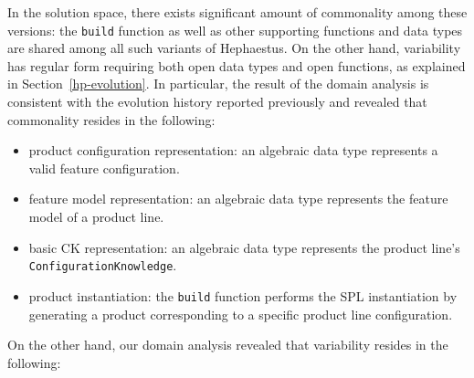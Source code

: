 In the solution space, there exists significant amount of commonality among these versions: the \texttt{build} function as well as other supporting functions and data types are shared among all such variants of Hephaestus.  On the other hand, variability has regular form requiring both
open data types and open functions, as explained in Section~\ref{hp-evolution}. In particular, the result of the domain analysis is consistent with the evolution history reported previously and revealed that commonality resides in the following:

\begin{itemize}
  \item product configuration representation: an algebraic data type represents a valid feature configuration.

  \item feature model representation: an algebraic data type represents the feature model of a product line.

  \item basic CK representation: an algebraic data type represents the product line's  \texttt{ConfigurationKnowledge}.

  \item product instantiation: the \texttt{build} function performs the SPL instantiation by generating a product corresponding to a specific product line configuration.


\end{itemize}

On the other hand, our domain analysis revealed that \hpl{} variability resides in the following:

